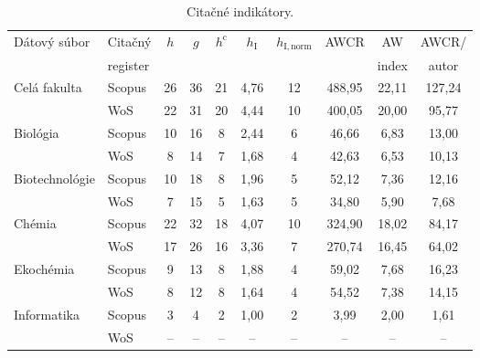 \begin{table}
\centering\small
\begin{tabular}{llcccccccc}
  \hline\noalign{\vspace{.3ex}}
  Dátový súbor & Citačný  & $h$ & $g$ & $h^{\mathrm{c}}$ & $h_{\mathrm{I}}$ & $h_{\mathrm{I, norm}}$ & AWCR & AW    & AWCR/ \\
               & register &     &     &                  &                  &                        &       & index & autor \\[0.3ex]
  \hline\noalign{\vspace{.5ex}}
  Celá fakulta   & Scopus & 26 & 36 & 21 & 4,76 & 12 & 488,95 & 22,11 & 127,24 \\
                 & WoS    & 22 & 31 & 20 & 4,44 & 10 & 400,05 & 20,00 &  95,77 \\[1ex]
  Biológia       & Scopus & 10 & 16 &  8 & 2,44 &  6 &  46,66 &  6,83 &  13,00 \\
                 & WoS    &  8 & 14 &  7 & 1,68 &  4 &  42,63 &  6,53 &  10,13 \\[1ex]
  Biotechnológie & Scopus & 10 & 18 &  8 & 1,96 &  5 &  52,12 &  7,36 &  12,16 \\
                 & WoS    &  7 & 15 &  5 & 1,63 &  5 &  34,80 &  5,90 &   7,68 \\[1ex]
  Chémia         & Scopus & 22 & 32 & 18 & 4,07 & 10 & 324,90 & 18,02 &  84,17 \\
                 & WoS    & 17 & 26 & 16 & 3,36 &  7 & 270,74 & 16,45 &  64,02 \\[1ex]
  Ekochémia      & Scopus &  9 & 13 &  8 & 1,88 &  4 &  59,02 &  7,68 &  16,23 \\
                 & WoS    &  8 & 12 &  8 & 1,64 &  4 &  54,52 &  7,38 &  14,15 \\[1ex]
  Informatika    & Scopus &  3 &  4 &  2 & 1,00 &  2 &   3,99 &  2,00 &   1,61 \\
                 & WoS    & -- & -- & -- &  --  & -- &  --    & --    &  --    \\[0.5ex]
  \hline
\end{tabular}
\caption{Citačné indikátory.}
\label{tab:citation.indicators}
\end{table}

